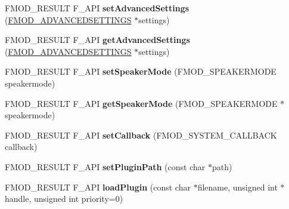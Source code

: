 \begin{DoxyCompactItemize}
\item 
\hypertarget{class_f_m_o_d_1_1_system_a8e7c0f550c5c540d8889fb835992cff5}{F\-M\-O\-D\-\_\-\-R\-E\-S\-U\-L\-T F\-\_\-\-A\-P\-I {\bfseries set\-Advanced\-Settings} (\hyperlink{struct_f_m_o_d___a_d_v_a_n_c_e_d_s_e_t_t_i_n_g_s}{F\-M\-O\-D\-\_\-\-A\-D\-V\-A\-N\-C\-E\-D\-S\-E\-T\-T\-I\-N\-G\-S} $\ast$settings)}\label{class_f_m_o_d_1_1_system_a8e7c0f550c5c540d8889fb835992cff5}

\item 
\hypertarget{class_f_m_o_d_1_1_system_a9c111315da6297cb6889aedfd46c3daa}{F\-M\-O\-D\-\_\-\-R\-E\-S\-U\-L\-T F\-\_\-\-A\-P\-I {\bfseries get\-Advanced\-Settings} (\hyperlink{struct_f_m_o_d___a_d_v_a_n_c_e_d_s_e_t_t_i_n_g_s}{F\-M\-O\-D\-\_\-\-A\-D\-V\-A\-N\-C\-E\-D\-S\-E\-T\-T\-I\-N\-G\-S} $\ast$settings)}\label{class_f_m_o_d_1_1_system_a9c111315da6297cb6889aedfd46c3daa}

\item 
\hypertarget{class_f_m_o_d_1_1_system_a08636005f5f2a6a435470a56a3bfb6a8}{F\-M\-O\-D\-\_\-\-R\-E\-S\-U\-L\-T F\-\_\-\-A\-P\-I {\bfseries set\-Speaker\-Mode} (F\-M\-O\-D\-\_\-\-S\-P\-E\-A\-K\-E\-R\-M\-O\-D\-E speakermode)}\label{class_f_m_o_d_1_1_system_a08636005f5f2a6a435470a56a3bfb6a8}

\item 
\hypertarget{class_f_m_o_d_1_1_system_a4ed6cc41bbb35016a0093054c17c0a4a}{F\-M\-O\-D\-\_\-\-R\-E\-S\-U\-L\-T F\-\_\-\-A\-P\-I {\bfseries get\-Speaker\-Mode} (F\-M\-O\-D\-\_\-\-S\-P\-E\-A\-K\-E\-R\-M\-O\-D\-E $\ast$speakermode)}\label{class_f_m_o_d_1_1_system_a4ed6cc41bbb35016a0093054c17c0a4a}

\item 
\hypertarget{class_f_m_o_d_1_1_system_a479bb915a2e04c9374f599f007b6cc0a}{F\-M\-O\-D\-\_\-\-R\-E\-S\-U\-L\-T F\-\_\-\-A\-P\-I {\bfseries set\-Callback} (F\-M\-O\-D\-\_\-\-S\-Y\-S\-T\-E\-M\-\_\-\-C\-A\-L\-L\-B\-A\-C\-K callback)}\label{class_f_m_o_d_1_1_system_a479bb915a2e04c9374f599f007b6cc0a}

\item 
\hypertarget{class_f_m_o_d_1_1_system_ae1a00669920caf97abb5228d2053a28a}{F\-M\-O\-D\-\_\-\-R\-E\-S\-U\-L\-T F\-\_\-\-A\-P\-I {\bfseries set\-Plugin\-Path} (const char $\ast$path)}\label{class_f_m_o_d_1_1_system_ae1a00669920caf97abb5228d2053a28a}

\item 
\hypertarget{class_f_m_o_d_1_1_system_a046e94ca835e30f60564dbf44cfa111f}{F\-M\-O\-D\-\_\-\-R\-E\-S\-U\-L\-T F\-\_\-\-A\-P\-I {\bfseries load\-Plugin} (const char $\ast$filename, unsigned int $\ast$handle, unsigned int priority=0)}\label{class_f_m_o_d_1_1_system_a046e94ca835e30f60564dbf44cfa111f}


\end{DoxyCompactItemize}
